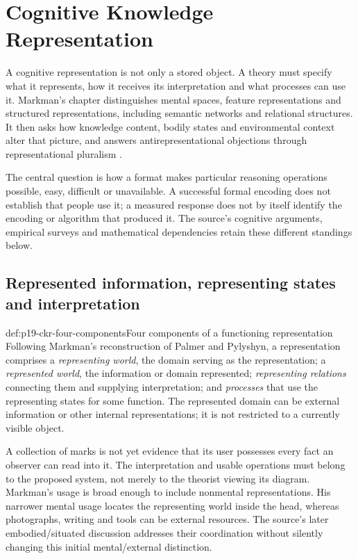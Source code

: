 \chapter{Cognitive Knowledge Representation}
\label{sec:p19-cognitive-knowledge-representation}

A cognitive representation is not only a stored object. A theory must
specify what it represents, how it receives its interpretation and
what processes can use it. Markman's chapter distinguishes mental
spaces, feature representations and structured representations,
including semantic networks and relational structures. It then asks
how knowledge content, bodily states and environmental context alter
that picture, and answers antirepresentational objections through
representational pluralism
\cite[chap.~4, pp.~36--51]{Markman2012CognitiveRepresentation}.

The central question is how a format makes particular reasoning
operations possible, easy, difficult or unavailable. A successful
formal encoding does not establish that people use it; a measured
response does not by itself identify the encoding or algorithm that
produced it. The source's cognitive arguments, empirical surveys and
mathematical dependencies retain these different standings below.

\section{Represented information, representing states and interpretation}
\label{sec:p19-ckr-definition}

\begin{hbdefinition}{def:p19-ckr-four-components}{Four components of a functioning representation}
Following Markman's reconstruction of Palmer and Pylyshyn, a
representation comprises a \emph{representing world}, the domain
serving as the representation; a \emph{represented world}, the
information or domain represented; \emph{representing relations}
connecting them and supplying interpretation; and \emph{processes}
that use the representing states for some function. The represented
domain can be external information or other internal representations;
it is not restricted to a currently visible object.

A collection of marks is not yet evidence that its user possesses
every fact an observer can read into it. The interpretation and
usable operations must belong to the proposed system, not merely
to the theorist viewing its diagram. Markman's usage is broad enough
to include nonmental representations. His narrower mental usage
locates the representing world inside the head, whereas photographs,
writing and tools can be external resources. The source's later
embodied/situated discussion addresses their coordination without
silently changing this initial mental/external distinction.
\end{hbdefinition}

